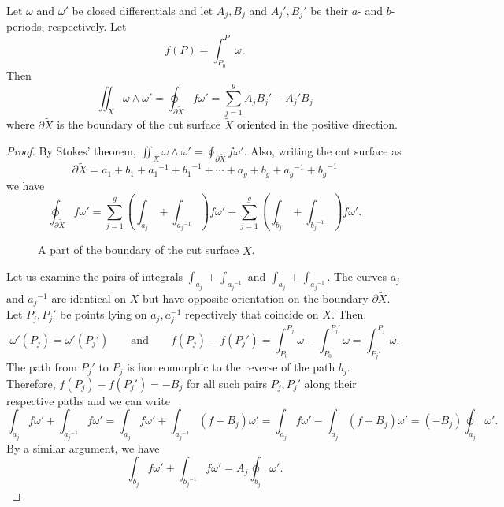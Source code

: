 \begin{theorem} \label{thm:bilinear-relations}
  Let $\omega$ and $\omega'$ be closed differentials and let $A_j,B_j$ and
  $A_j',B_j'$ be their $a$- and $b$-periods, respectively. Let
  \[
  f(P) = \int_{P_0}^P \omega.
  \]
  Then
  \begin{equation} \label{eqn:closed-differential-periods}
    \iint_X \omega \wedge \omega'
    =
    \oint_{\partial \tilde{X}} f \omega'
    =
    \sum_{j=1}^g A_jB_j' - A_j'B_j
  \end{equation}
  where $\partial \tilde{X}$ is the boundary of the cut surface $\tilde{X}$
  oriented in the positive direction.
\end{theorem}
\begin{proof}
  By Stokes' theorem, $\iint_X \omega \wedge \omega' = \oint_{\partial
    \tilde{X}} f \omega'$. Also, writing the cut surface as
  \[
  \partial \tilde{X}
  =
  a_1 + b_1 + {a_1}^{-1} + {b_1}^{-1}
  + \cdots +
  a_g + b_g + {a_g}^{-1} + {b_g}^{-1}
  \]
  we have
  \begin{equation}
    \oint_{\partial \tilde{X}} f \omega'
    =
    \sum_{j=1}^g \left(
    \int_{a_j} + \int_{{a_j}^{-1}}
    \right) f \omega'
    +
    \sum_{j=1}^g \left(
    \int_{b_j} + \int_{{b_j}^{-1}}
    \right) f \omega'.
  \end{equation}

  \begin{figure}
    \centering
    \begin{tikzpicture}
      
    \end{tikzpicture}
    \caption{A part of the boundary of the cut surface $\tilde{X}$.}
  \end{figure}

  Let us examine the pairs of integrals $\int_{a_j} + \int_{{a_j}^{-1}}$ and
  $\int_{a_j} + \int_{{a_j}^{-1}}$. The curves $a_j$ and ${a_j}^{-1}$ are
  identical on $X$ but have opposite orientation on the boundary $\partial
  \tilde{X}$. Let $P_j, P_j'$ be points lying on $a_j,a^{-1}_j$ repectively
  that coincide on $X$. Then,
  \begin{equation} \label{eqn:bilinear-coincide}
    \omega'(P_j) = \omega'(P_j')
    \qquad \text{and} \qquad
    f(P_j) - f(P_j')
    =
    \int_{P_0}^{P_j} \omega - \int_{P_0}^{P_j'} \omega
    =
    \int_{P_j'}^{P_j} \omega.
  \end{equation}
  The path from $P_j'$ to $P_j$ is homeomorphic to the reverse of the path
  $b_j$. Therefore, $f(P_j) - f(P_j') = -B_j$ for all such pairs $P_j,P_j'$
  along their respective paths and we can write
  \begin{equation}
    \int_{a_j} f \omega' + \int_{{a_j}^{-1}} f \omega'
    =
    \int_{a_j} f \omega' + \int_{{a_j}^{-1}} (f + B_j) \omega'
    =
    \int_{a_j} f \omega' - \int_{a_j} (f + B_j) \omega'
    =
    (-B_j) \oint_{a_j} \omega'.
  \end{equation}
  By a similar argument, we have
  \begin{equation}
    \int_{b_j} f \omega' + \int_{{b_j}^{-1}} f \omega'
    =
    A_j \oint_{b_j} \omega'.
  \end{equation}
\end{proof}

